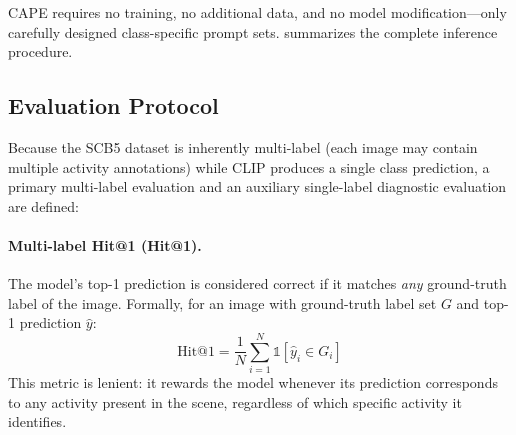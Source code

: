 \documentclass[symmetry,article,submit,pdftex,moreauthors]{Definitions/mdpi}
\begin{document}
CAPE requires no training, no additional data, and no model modification---only carefully designed class-specific prompt sets.
 summarizes the complete inference procedure.

\begin{algorithm}[H]
\DontPrintSemicolon
\SetAlgoLined
{}
\BlankLine
{}
\BlankLine
{}
\caption{CAPE: Class-Aware Prompt Ensemble Inference}
\label{alg:cape}
\end{algorithm}



\subsection{Evaluation Protocol}
\label{sec:eval_protocol}

Because the SCB5 dataset is inherently multi-label (each image may contain multiple activity annotations) while CLIP produces a single class prediction, a primary multi-label evaluation and an auxiliary single-label diagnostic evaluation are defined:

\paragraph{Multi-label Hit@1 (Hit@1).}
The model's top-1 prediction is considered correct if it matches \emph{any} ground-truth label of the image.
Formally, for an image with ground-truth label set $G$ and top-1 prediction $\hat{y}$:
\begin{equation}
\text{Hit@1} = \frac{1}{N}\sum_{i=1}^{N} \mathbb{1}[\hat{y}_i \in G_i]
\end{equation}
This metric is lenient: it rewards the model whenever its prediction corresponds to any activity present in the scene, regardless of which specific activity it identifies.
\end{document}
